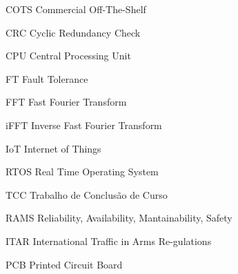 \listoffigures*
\cleardoublepage


\listofquadros*
\cleardoublepage
\listofequacao*
\cleardoublepage

\begin{siglas}
    \item[COTS] Commercial Off-The-Shelf
    \item[CRC]  Cyclic Redundancy Check
    \item[CPU]  Central Processing Unit
    \item[FT]   Fault Tolerance
    \item[FFT]  Fast Fourier Transform
    \item[iFFT] Inverse Fast Fourier Transform
    \item[IoT]  Internet of Things
    \item[RTOS] Real Time Operating System
    \item[TCC]  Trabalho de Conclusão de Curso
    \item[RAMS] Reliability, Availability, Mantainability, Safety
    \item[ITAR] International Traffic in Arms Re-gulations
    \item[PCB]  Printed Circuit Board
\end{siglas}


\tableofcontents*
\cleardoublepage

